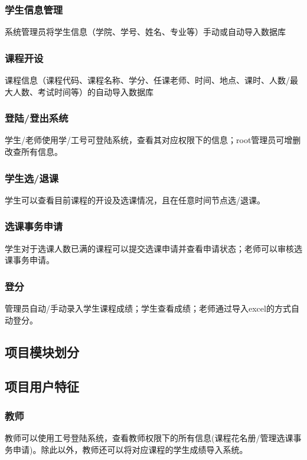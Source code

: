 \subsubsection{学生信息管理}
系统管理员将学生信息（学院、学号、姓名、专业等）手动或自动导入数据库

\subsubsection{课程开设}
课程信息（课程代码、课程名称、学分、任课老师、时间、地点、课时、人数/最大人数、考试时间等）的自动导入数据库

\subsubsection{登陆/登出系统}
学生/老师使用学/工号可登陆系统，查看其对应权限下的信息；root管理员可增删改查所有信息。

\subsubsection{学生选/退课}
学生可以查看目前课程的开设及选课情况，且在任意时间节点选/退课。

\subsubsection{选课事务申请}
学生对于选课人数已满的课程可以提交选课申请并查看申请状态；老师可以审核选课事务申请。

\subsubsection{登分}
管理员自动/手动录入学生课程成绩；学生查看成绩；老师通过导入excel的方式自动登分。




\subsection{项目模块划分}
 

\subsection{项目用户特征}
\subsubsection{教师}
教师可以使用工号登陆系统，查看教师权限下的所有信息(课程花名册/管理选课事务申请)。除此以外，教师还可以将对应课程的学生成绩导入系统。
